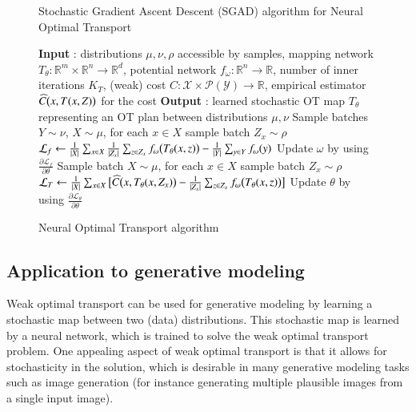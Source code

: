 \documentclass[11pt]{article}
\begin{document}
\begin{figure}[H]
    \begin{algorithm}[H]
        \caption{Stochastic Gradient Ascent Descent (SGAD) algorithm for Neural Optimal Transport}
        \begin{algorithmic}[1]
            \State \textbf{Input} : distributions $\mu,\nu,\rho$ accessible by samples, mapping network $T_{\theta}:\mathbb{R}^{m}\times\mathbb{R}^{n}\rightarrow\mathbb{R}^{d}$, potential network $f_{\omega}:\mathbb{R}^{n}\rightarrow\mathbb{R}$, number of inner iterations $K_{T}$, (weak) cost $C:\mathcal{X}\times\mathcal{P}(\mathcal{Y})\rightarrow\mathbb{R}$, empirical estimator $\widehat{C}\big{(}x,T(x,Z)\big{)}$ for the cost
            \State \textbf{Output} : learned stochastic OT map $T_{\theta}$ representing an OT plan between distributions $\mu,\nu$
            \Repeat
            \State Sample batches $Y\sim\nu$, $X\sim\mu$, for each $x\in X$ sample batch $Z_{x}\sim\rho$
            \State $\mathcal{L}_{f}\leftarrow\frac{1}{|X|}\sum_{x\in X}\frac{1}{|Z_{x}|}\sum_{z \in Z_{x}}f_{\omega}\big{(}T_{\theta}(x,z)\big{)}-\frac{1}{|Y|}\sum_{y\in Y}f_{ \omega}(y)$
            \State Update $\omega$ by using $\frac{\partial\mathcal{L}_{f}}{\partial\theta}$
            \State Sample batch $X\sim\mu$, for each $x\in X$ sample batch $Z_{x}\sim\rho$
            \State $\mathcal{L}_{T}\leftarrow\frac{1}{|X|}\sum_{x\in X}\big{[}\widehat{C}\big{(}x,T_{\theta}(x,Z_{x})\big{)}-\frac{1}{|Z_{x}|}\sum_{z\in Z_{x}}f_{\omega}\big{(} T_{\theta}(x,z)\big{)}\big{]}$
            \State Update $\theta$ by using $\frac{\partial\mathcal{L}_{\theta}}{\partial\theta}$
            \EndFor
        \end{algorithmic}
    \end{algorithm}
    \caption{Neural Optimal Transport algorithm \cite{korotin-2022}}
    \label{fig:sgad}
\end{figure}

\subsection{Application to generative modeling}

Weak optimal transport can be used for generative modeling by learning a stochastic map between two (data) distributions. This stochastic map is learned by a neural network, which is trained to solve the weak optimal transport problem. One appealing aspect of weak optimal transport is that it allows for stochasticity in the solution, which is desirable in many generative modeling tasks such as image generation (for instance generating multiple plausible images from a single input image).
\end{document}
